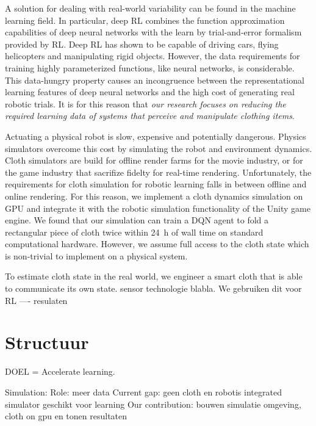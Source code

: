 \documentclass[\home/main.tex]{subfiles}
\begin{document}
A solution for dealing with real-world variability can be found in the machine learning field. In particular, deep \gls{RL} combines the function approximation capabilities of deep neural networks with the learn by trial-and-error formalism provided by \gls{RL}. Deep \gls{RL} has shown to be capable of driving cars, flying helicopters and manipulating rigid objects. However, the data requirements for training highly parameterized functions, like neural networks, is considerable. This data-hungry property causes an incongruence between the representational learning features of deep neural networks and the high cost of generating real robotic trials. It is for this reason that \emph{our research focuses on reducing the required learning data of systems that perceive and manipulate clothing items}.   


Actuating a physical robot is slow, expensive and potentially dangerous. Physics simulators overcome this cost by simulating the robot and environment dynamics. Cloth simulators are build for offline render farms for the movie industry, or for the game industry that sacrifize fidelty for real-time rendering. Unfortunately, the requirements for cloth simulation for robotic learning falls in between offline and online rendering. For this reason, we implement a cloth dynamics simulation on GPU and integrate it with the robotic simulation functionality of the Unity game engine. 
We found that our simulation can train a \gls{DQN} agent to fold a rectangular piece of cloth twice within \qty{24}{\hour} of wall time on standard computational hardware. However, we assume full access to the cloth state which is non-trivial to implement on a physical system. 

To estimate cloth state in the real world, we engineer a smart cloth that is able to communicate its own state. 
sensor technologie blabla. 
We gebruiken dit voor RL ---- resulaten 

\section{Structuur}

DOEL = Accelerate learning. 

Simulation:
    Role: meer data 
    Current gap: geen cloth en robotis integrated simulator geschikt voor learning 
    Our contribution: bouwen simulatie omgeving, cloth on gpu en tonen resultaten 
\end{document}
